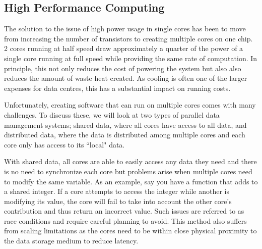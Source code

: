 \subsection{High Performance Computing}

The solution to the issue of high power usage in single cores has been to move from increasing the number of transistors to creating multiple cores on one chip. 2 cores running at half speed draw approximately a quarter of the power of a single core running at full speed while providing the same rate of computation. In principle, this not only reduces the cost of powering the system but also also reduces the amount of waste heat created. As cooling is often one of the larger expenses for data centres, this has a substantial impact on running costs.

Unfortunately, creating software that can run on multiple cores comes with many challenges. To discuss these, we will look at two types of parallel data management systems; shared data, where all cores have access to all data, and distributed data, where the data is distributed among multiple cores and each core only has access to its ``local" data.

With shared data, all cores are able to easily access any data they need and there is no need to synchronize each core but problems arise when multiple cores need to modify the same variable. As an example, say you have a function that adds to a shared integer. If a core attempts to access the integer while another is modifying its value, the core will fail to take into account the other core's contribution and thus return an incorrect value. Such issues are referred to as race conditions and require careful planning to avoid. This method also suffers from scaling limitations as the cores need to be within close physical proximity to the data storage medium to reduce latency.

